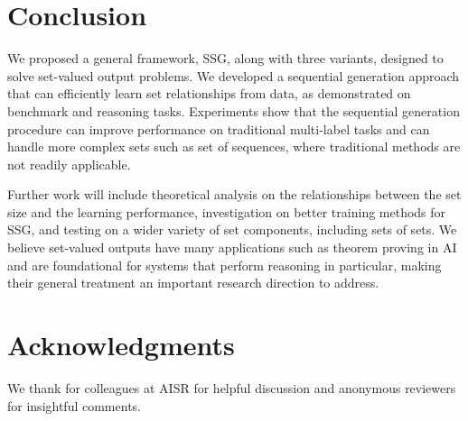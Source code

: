 \documentclass[letterpaper]{article} %
\begin{document}
\section{Conclusion}
We proposed a general framework, SSG, along with three variants, designed to solve set-valued output problems. We developed a sequential generation approach that can efficiently learn set relationships from data, as demonstrated on benchmark and reasoning tasks.  Experiments show that the sequential generation procedure can improve performance on traditional multi-label tasks and can handle more complex sets such as set of sequences, where traditional methods are not readily applicable. 

Further work will include theoretical analysis on the relationships between the set size and the learning performance, investigation on better training methods for SSG, and testing on a wider variety of set components, including sets of sets. We believe set-valued outputs have many applications such as theorem proving in AI and are foundational for systems that perform reasoning in particular, making their general treatment an important research direction to address. 


\section{Acknowledgments}
We thank for colleagues at AISR for helpful discussion and anonymous reviewers for insightful comments.



\end{document}
